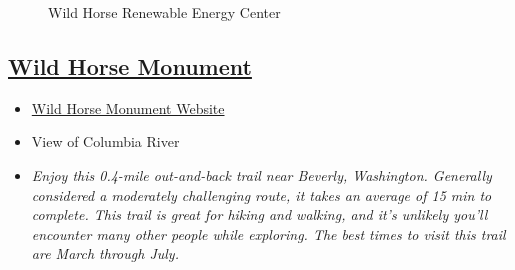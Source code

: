 \documentclass{article}
\newcommand{\WildHorseMonument}{\href{https://maps.app.goo.gl/RgAQq2vTrCyx1wKb7}{Wild Horse Monument}}
\newcommand{\WildHorseMonumentWebsite}{\href{https://www.wta.org/go-hiking/hikes/wild-horses-monument}{Wild Horse Monument Website}}
\begin{document}
  \begin{figure}[H]
    \centering
    \caption{Wild Horse Renewable Energy Center}
  \end{figure}

\subsection{\WildHorseMonument}
\begin{itemize}
  \item{\WildHorseMonumentWebsite}
  \item{View of Columbia River}
  \item{\textit{Enjoy this 0.4-mile out-and-back trail near Beverly, Washington. Generally considered a moderately challenging route, it takes an average of 15 min to complete.
  This trail is great for hiking and walking, and it's unlikely you'll encounter many other people while exploring. The best times to visit this trail are March through July.}}
\end{itemize}
\end{document}
